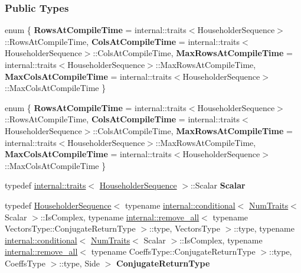\subsubsection*{Public Types}
\begin{DoxyCompactItemize}
\item 
\mbox{\label{group___householder___module_a203de7a3566f4ad38a45883dc52484d6}} 
enum \{ {\bfseries Rows\+At\+Compile\+Time} = internal\+:\+:traits$<$Householder\+Sequence$>$\+:\+:Rows\+At\+Compile\+Time, 
{\bfseries Cols\+At\+Compile\+Time} = internal\+:\+:traits$<$Householder\+Sequence$>$\+:\+:Cols\+At\+Compile\+Time, 
{\bfseries Max\+Rows\+At\+Compile\+Time} = internal\+:\+:traits$<$Householder\+Sequence$>$\+:\+:Max\+Rows\+At\+Compile\+Time, 
{\bfseries Max\+Cols\+At\+Compile\+Time} = internal\+:\+:traits$<$Householder\+Sequence$>$\+:\+:Max\+Cols\+At\+Compile\+Time
 \}
\item 
\mbox{\label{group___householder___module_a7d0a8d12ca47001c6283b5e05ebc33a3}} 
enum \{ {\bfseries Rows\+At\+Compile\+Time} = internal\+:\+:traits$<$Householder\+Sequence$>$\+:\+:Rows\+At\+Compile\+Time, 
{\bfseries Cols\+At\+Compile\+Time} = internal\+:\+:traits$<$Householder\+Sequence$>$\+:\+:Cols\+At\+Compile\+Time, 
{\bfseries Max\+Rows\+At\+Compile\+Time} = internal\+:\+:traits$<$Householder\+Sequence$>$\+:\+:Max\+Rows\+At\+Compile\+Time, 
{\bfseries Max\+Cols\+At\+Compile\+Time} = internal\+:\+:traits$<$Householder\+Sequence$>$\+:\+:Max\+Cols\+At\+Compile\+Time
 \}
\item 
\mbox{\label{group___householder___module_a3d464600d251c30a702ac584c0511b7e}} 
typedef \hyperlink{struct_eigen_1_1internal_1_1traits}{internal\+::traits}$<$ \hyperlink{group___householder___module_class_eigen_1_1_householder_sequence}{Householder\+Sequence} $>$\+::Scalar {\bfseries Scalar}
\item 
\mbox{\label{group___householder___module_a4b40914484b1a2fb3dbf3ea3ebf60252}} 
typedef \hyperlink{group___householder___module_class_eigen_1_1_householder_sequence}{Householder\+Sequence}$<$ typename \hyperlink{struct_eigen_1_1internal_1_1conditional}{internal\+::conditional}$<$ \hyperlink{group___core___module_struct_eigen_1_1_num_traits}{Num\+Traits}$<$ Scalar $>$\+::Is\+Complex, typename \hyperlink{struct_eigen_1_1internal_1_1remove__all}{internal\+::remove\+\_\+all}$<$ typename Vectors\+Type\+::\+Conjugate\+Return\+Type $>$\+::type, Vectors\+Type $>$\+::type, typename \hyperlink{struct_eigen_1_1internal_1_1conditional}{internal\+::conditional}$<$ \hyperlink{group___core___module_struct_eigen_1_1_num_traits}{Num\+Traits}$<$ Scalar $>$\+::Is\+Complex, typename \hyperlink{struct_eigen_1_1internal_1_1remove__all}{internal\+::remove\+\_\+all}$<$ typename Coeffs\+Type\+::\+Conjugate\+Return\+Type $>$\+::type, Coeffs\+Type $>$\+::type, Side $>$ {\bfseries Conjugate\+Return\+Type}

\end{DoxyCompactItemize}
